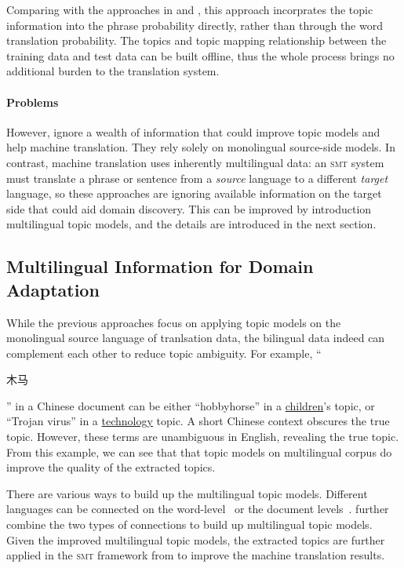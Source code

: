 Comparing with the approaches in \citet{Eidelman-12} and
\citet{hasler-12}, this approach incorprates the topic information
into the phrase probability directly, rather than through the word
translation probability. The topics and topic mapping relationship
between the training data and test data can be built offline, thus the
whole process brings no additional burden to the translation system.

\paragraph{Problems}

However, \citet{Eidelman-12,hasler-12,su-12} ignore a wealth of
information that could improve topic models and help machine
translation. They rely solely on monolingual source-side models. In
contrast, machine translation uses inherently multilingual data: an
\textsc{smt} system must translate a phrase or sentence from a
\emph{source} language to a different \emph{target} language, so these
approaches are ignoring available information on the target side that
could aid domain discovery. This can be improved by introduction
multilingual topic models, and the details are introduced in the next
section.

\subsection{Multilingual Information for Domain Adaptation}
\label{sec:trans-multiling}

While the previous approaches focus on applying topic models on the
monolingual source language of tranlsation data, the bilingual data
indeed can complement each other to reduce topic ambiguity.  For
example, ``\begin{CJK*}{UTF8}{gbsn}木马\end{CJK*}'' in a Chinese
  document can be either ``hobbyhorse'' in a \underline{children}'s
  topic, or ``Trojan virus'' in a \underline{technology} topic.  A
  short Chinese context obscures the true topic. However, these terms
  are unambiguous in English, revealing the true topic. From this
  example, we can see that that topic models on multilingual corpus do
  improve the quality of the extracted topics.

There are various ways to build up the multilingual topic
models. Different languages can be connected on the
word-level~\citep{boyd-graber-07,andrzejewski-09,hu-14:itm} or the
document levels~\citep{mimno-09}. \citet{hu-14} further combine the
two types of connections to build up multilingual topic models. Given
the improved multilingual topic models, the extracted topics are
further applied in the \textsc{smt} framework from \citet{Eidelman-12}
to improve the machine translation results.

